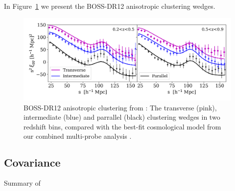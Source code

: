 In Figure~\ref{fig:wedges} we present the BOSS-DR12 anisotropic
clustering wedges.
\begin{figure}
        \includegraphics[width=\textwidth]{Data_Plots/clustering_wedges/BOSS_Sanchez_wedges.png}
        \caption{BOSS-DR12 anisotropic clustering from \citet{sanchez/etal:2017}:
          The transverse (pink), intermediate (blue) and parrallel
          (black) clustering wedges in two redshift bins, compared 
          with the best-fit
          cosmological model from our combined multi-probe analysis
          .}
        \label{fig:wedges}
\end{figure}

\subsection{Covariance}
\label{sec:Cov}
Summary of \citet{joachimi/etal:inprep}

